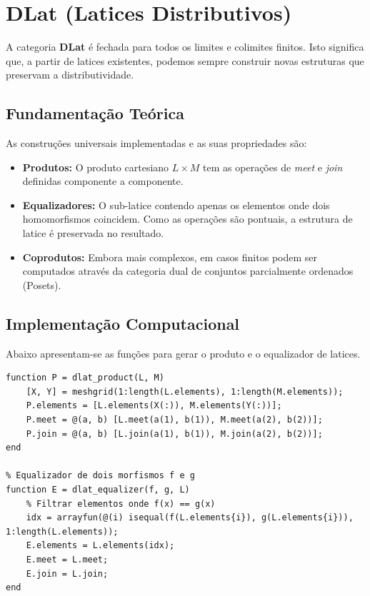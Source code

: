 \section{DLat (Latices Distributivos)}

A categoria \textbf{DLat} é fechada para todos os limites e colimites finitos. Isto significa que, a partir de latices existentes, podemos sempre construir novas estruturas que preservam a distributividade.

\subsection{Fundamentação Teórica}
As construções universais implementadas e as suas propriedades são:
\begin{itemize}
    \item \textbf{Produtos:} O produto cartesiano $L \times M$ tem as operações de \textit{meet} e \textit{join} definidas componente a componente.
    \item \textbf{Equalizadores:} O sub-latice contendo apenas os elementos onde dois homomorfismos coincidem. Como as operações são pontuais, a estrutura de latice é preservada no resultado.
    \item \textbf{Coprodutos:} Embora mais complexos, em casos finitos podem ser computados através da categoria dual de conjuntos parcialmente ordenados (Posets).
\end{itemize}

\subsection{Implementação Computacional}
Abaixo apresentam-se as funções para gerar o produto e o equalizador de latices.

\begin{lstlisting}[caption={Produtos e Equalizadores em DLat}]
% Produto de dois latices
function P = dlat_product(L, M)
    [X, Y] = meshgrid(1:length(L.elements), 1:length(M.elements));
    P.elements = [L.elements(X(:)), M.elements(Y(:))];
    P.meet = @(a, b) [L.meet(a(1), b(1)), M.meet(a(2), b(2))];
    P.join = @(a, b) [L.join(a(1), b(1)), M.join(a(2), b(2))];
end

% Equalizador de dois morfismos f e g
function E = dlat_equalizer(f, g, L)
    % Filtrar elementos onde f(x) == g(x)
    idx = arrayfun(@(i) isequal(f(L.elements{i}), g(L.elements{i})), 1:length(L.elements));
    E.elements = L.elements(idx);
    E.meet = L.meet;
    E.join = L.join;
end
\end{lstlisting}